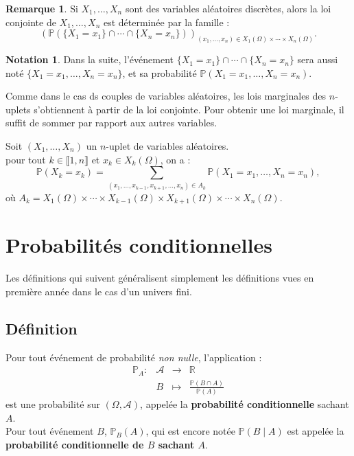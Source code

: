 \documentclass[french]{article}
\renewcommand{\P}{\mathbb{P}}
\newcommand{\R}{\mathbb{R}}
\theoremstyle{plain}
\theoremstyle{definition}
\newtheorem*{rmq}{Remarque}
\newtheorem*{notation}{Notation}
\theoremstyle{remark}
\begin{document}
\begin{rmq}
	Si $X_1,\ldots,X_n$ sont des variables aléatoires discrètes, alors la loi conjointe de $X_1,\ldots,X_n$ est déterminée par la famille :
	$$\left(\P(\{X_1=x_1\}\cap\cdots\cap\{X_n=x_n\})\right)_{(x_1,\ldots,x_n)\in X_1(\Omega)\times\cdots\times X_n(\Omega)}.$$
\end{rmq}

\begin{notation}
	Dans la suite, l'événement $\{X_1=x_1\}\cap\cdots\cap\{X_n=x_n\}$ sera aussi noté $\{X_1=x_1,\ldots,X_n=x_n\}$, et sa probabilité $\P(X_1=x_1,\ldots,X_n=x_n)$.
\end{notation}

Comme dans le cas ds couples de variables aléatoires, les lois marginales des $n$-uplets s'obtiennent à partir de la loi conjointe. Pour obtenir une loi marginale, il suffit de sommer par rapport aux autres variables.

\begin{thm}%
	Soit $(X_1,\ldots,X_n)$ un $n$-uplet de variables aléatoires.\\
	pour tout $k\in\llbracket1,n\rrbracket$ et $x_k\in X_k(\Omega)$, on a :
	$$\P(X_k=x_k)=\sum_{(x_1,\ldots,x_{k-1},x_{k+1},\ldots,x_n)\in A_k}\P(X_1=x_1,\ldots,X_n=x_n),$$ où $A_k=X_1(\Omega)\times\cdots\times X_{k-1}(\Omega)\times X_{k+1}(\Omega)\times\cdots\times X_n(\Omega)$.
\end{thm}

\section{Probabilités conditionnelles}

Les définitions qui suivent généralisent simplement les définitions vues en première année dans le cas d'un univers fini.

\subsection{Définition}

\begin{thm}%
	Pour tout événement de probabilité \textit{non nulle}, l'application :
	$$\begin{array}{lrcl}
		\P_A:&\mathcal{A}&\longrightarrow&\R\\
		&B&\longmapsto&\displaystyle\frac{\P(B\cap A)}{\P(A)}
	\end{array}$$ est une probabilité sur $(\Omega,\mathcal{A})$, appelée la \textbf{probabilité conditionnelle} sachant $A$.\\
	 Pour tout événement $B$, $\P_B(A)$, qui est encore notée $\P(B\mid A)$ est appelée la \textbf{probabilité conditionnelle de $B$ sachant $A$}.
\end{thm}
\end{document}
